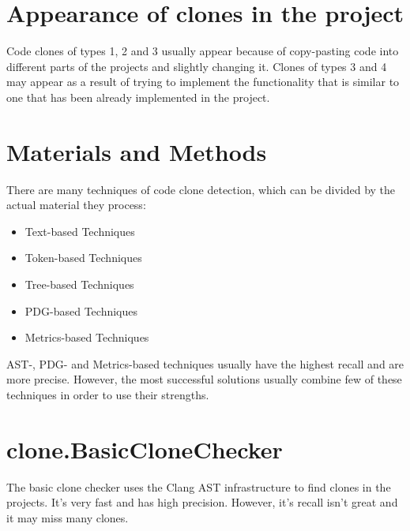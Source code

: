 \documentclass[a0,portrait]{a0poster}
\begin{document}
\begin{multicols}{2}

\section*{Appearance of clones in the project}

Code clones of types 1, 2 and 3 usually appear because of copy-pasting code into different parts
of the projects and slightly changing it. Clones of types 3 and 4 may appear as a result of
trying to implement the functionality that is similar to one that has been already implemented
in the project.


\section*{Materials and Methods}

There are many techniques of code clone detection, which can be divided by the actual material
they process:

\begin{itemize}
\item Text-based Techniques
\item Token-based Techniques
\item Tree-based Techniques
\item PDG-based Techniques
\item Metrics-based Techniques
\end{itemize}

AST-, PDG- and Metrics-based techniques usually have the highest recall and are more precise. 
However, the most successful solutions usually combine few of these techniques in order to use
their strengths.


\section*{clone.BasicCloneChecker}

The basic clone checker uses the Clang AST infrastructure to find clones in the projects. It's
very fast and has high precision. However, it's recall isn't great and it may miss many clones.


\end{multicols}
\end{document}
